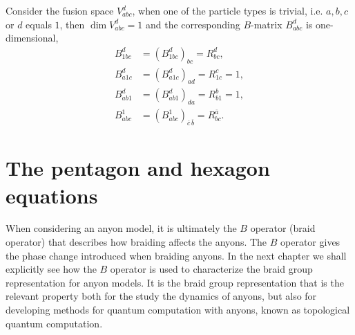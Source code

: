 \begin{lemma}\label{res:B1}
  Consider the fusion space $V_{abc}^d$, when one of the particle types is trivial, i.e. $a,b,c$ or $d$ equals $1$, then $\dim V_{abc}^d = 1$ and the corresponding $B$-matrix $B_{abc}^d$ is one-dimensional,
  \begin{equation}
    \begin{aligned}
      B_{1bc}^d &= \left( B_{1bc}^d \right)_{bc} = R_{bc}^d, \\
      B_{a1c}^d &= \left( B_{a1c}^d \right)_{ad} = R_{1c}^c = 1, \\
      B_{ab1}^d &= \left( B_{ab1}^d \right)_{da} = R_{b1}^b = 1, \\
      B_{abc}^1 &= \left( B_{abc}^1 \right)_{\overline{c}\,\overline{b}} = R_{bc}^{\overline{a}}.
    \end{aligned}
  \end{equation}
\end{lemma}















































\section{The pentagon and hexagon equations}\label{sec:pentagon hexagon}

When considering an anyon model, it is ultimately the $B$ operator (braid operator) that describes how braiding affects the anyons. The $B$ operator gives the phase change introduced when braiding anyons. In the next chapter we shall explicitly see how the $B$ operator is used to characterize the braid group representation for anyon models. It is the braid group representation that is the relevant property both for the study the dynamics of anyons, but also for developing methods for quantum computation with anyons, known as topological quantum computation.

